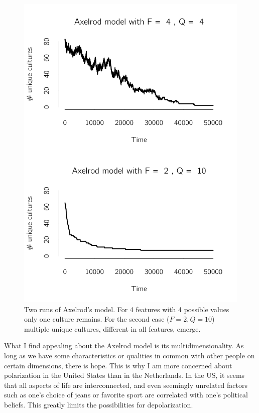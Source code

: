 \documentclass[
  a4paper,
  DIV=11,
  numbers=noendperiod,
  oneside]{scrreprt}
\begin{document}
\begin{figure}

{\centering \includegraphics{media/ch7/fig-ch7-img4-old-92.png}

}

\caption{\label{fig-ch7-img4-old-92}Two runs of Axelrod's model. For 4
features with 4 possible values only one culture remains. For the second
case (\(F = 2, Q = 10\)) multiple unique cultures, different in all
features, emerge.}

\end{figure}

What I find appealing about the Axelrod model is its
multidimensionality. As long as we have some characteristics or
qualities in common with other people on certain dimensions, there is
hope. This is why I am more concerned about polarization in the United
States than in the Netherlands. In the US, it seems that all aspects of
life are interconnected, and even seemingly unrelated factors such as
one's choice of jeans or favorite sport are correlated with one's
political beliefs. This greatly limits the possibilities for
depolarization.
\end{document}
